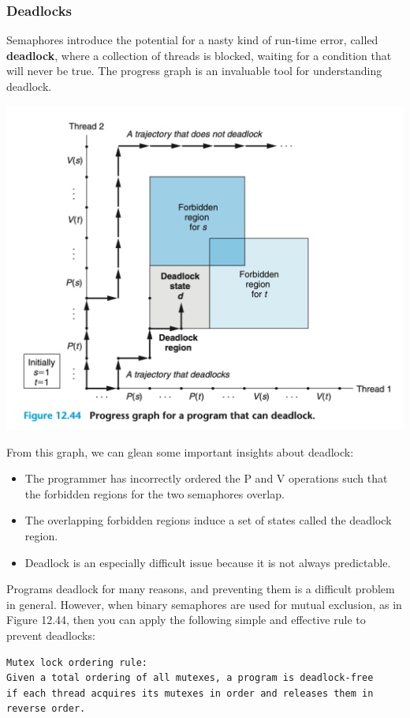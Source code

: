 \documentclass[11pt]{article}
\begin{document}
\subsubsection{Deadlocks}
\label{sec:org2133f23}
Semaphores introduce the potential for a nasty kind of run-time error, called \textbf{deadlock}, where a collection of threads is blocked, waiting for a condition that will never be true. The progress graph is an invaluable tool for understanding deadlock.\\

\begin{center}
\includegraphics[width=.9\linewidth]{pics/figure12.44-progress-graph-for-a-program-that-can-deadlock.png}
\end{center}

From this graph, we can glean some important insights about deadlock:\\
\begin{itemize}
\item The programmer has incorrectly ordered the P and V operations such that the forbidden regions for the two semaphores overlap.\\
\item The overlapping forbidden regions induce a set of states called the deadlock region.\\
\item Deadlock is an especially difficult issue because it is not always predictable.\\
\end{itemize}


Programs deadlock for many reasons, and preventing them is a difficult problem in general. However, when binary semaphores are used for mutual exclusion, as in Figure 12.44, then you can apply the following simple and effective rule to prevent deadlocks:\\
\begin{verbatim}
Mutex lock ordering rule: 
Given a total ordering of all mutexes, a program is deadlock-free 
if each thread acquires its mutexes in order and releases them in reverse order.
\end{verbatim}
\end{document}
